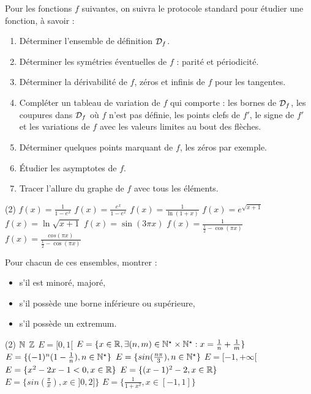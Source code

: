 \begin{exercise}[subtitle= Étude de fonctions, difficulty=*]
Pour les fonctions $f$ suivantes, on suivra le protocole standard pour étudier une fonction, à savoir :
\begin{enumerate}
	\item Déterminer l'ensemble de définition $\mathcal{D}_f$.
	\item Déterminer les symétries éventuelles de $f$ : parité et périodicité.
	\item Déterminer la dérivabilité de $f$,  zéros et infinis de $f$ pour les tangentes.
	\item Compléter un tableau de variation de $f$ qui comporte : les bornes de $\mathcal{D}_f$, les coupures dans $\mathcal{D}_f$ où $f$ n'est pas définie, les points clefs de $f'$, le signe de $f'$ et les variations de $f$ avec les valeurs limites au bout des flèches.
	\item Déterminer quelques points marquant de $f$, les zéros par exemple.
	\item Étudier les asymptotes de $f$.
	\item Tracer l'allure du graphe de $f$ avec tous les éléments.
\end{enumerate}
	\begin{tasks}(2)
		\task $f(x)= \frac{1}{1-e^x}$
	    \task $f(x)= \frac{e^x}{1-e^x}$
		\task $f(x)= \frac{1}{\ln(1+x)}$
		\task $f(x)= e^{\sqrt{x+1}}$
	    \task $f(x)= \ln{\sqrt{x+1}}$
	    \task $f(x)= \sin(3 \pi x)$
	    \task $f(x)= \frac{1}{\frac{1}{2}-\cos(\pi x)}$
	    \task $f(x)= \frac{cos(\pi x)}{\frac{1}{2}-\cos(\pi x)}$
	\end{tasks}
\end{exercise}



\begin{exercise}[subtitle= Extrema de fonctions, difficulty=*]
	Pour chacun de ces ensembles, montrer :
	\begin{itemize}
		\item s'il est minoré, majoré,
		\item s'il possède une borne inférieure ou supérieure, 
		\item  s'il possède un extremum.
	\end{itemize}
	\begin{tasks}(2)
		\task $\mathbb{N}$
		\task $\mathbb{Z}$
		\task $E = [0,1[$
		\task $E = \{ x \in \mathbb{R}, \exists (n,m) \in \mathbb{N}^\star \times \mathbb{N}^\star : x=\frac{1}{n} + \frac{1}{m} \}$
		\task $E = \{(-1)^n(1-\frac{1}{n}), n \in \mathbb{N}^\star \}$
		\task $E = \{sin(\frac{n \pi}{3}), n \in \mathbb{N}^\star \}$
		\task $E = [-1,+\infty[$
		\task $E = \{x^2 - 2x -1 <0, x \in \mathbb{R} \}$
		\task $E = \{(x-1)^2-2, x \in \mathbb{R} \}$
	    \task $E = \{sin(\frac{\pi}{x}), x \in ]0,2] \}$
	    \task $E = \{\frac{1}{1+x^2}, x \in [-1,1] \}$
	\end{tasks}
\end{exercise}




